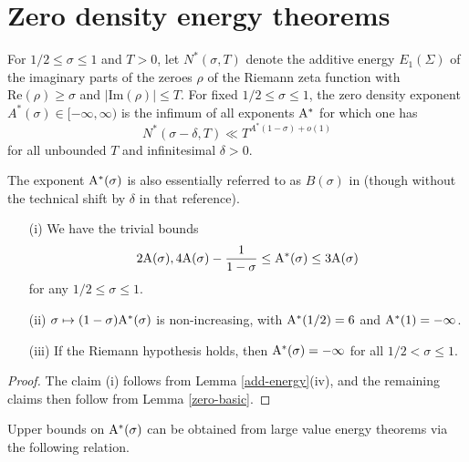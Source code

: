 \chapter{Zero density energy theorems}\label{zero-density-energy-chapter}


\begin{definition}\label{zeroe-def}  For $1/2 \leq \sigma \leq 1$ and $T>0$, let $N^*(\sigma,T)$ denote the additive energy $E_1(\Sigma)$ of the imaginary parts of the zeroes $\rho$ of the Riemann zeta function with $\mathrm{Re}(\rho) \geq \sigma$ and $|\mathrm{Im}(\rho)| \leq T$.  For fixed $1/2 \leq \sigma \leq 1$, the zero density exponent $A^*(\sigma) \in [-\infty,\infty)$ is the infimum of all exponents $\mathrm{A}^*$ for which one has
    $$ N^*(\sigma-\delta,T) \ll T^{A^* (1-\sigma)+o(1)}$$
for all unbounded $T$ and infinitesimal $\delta>0$.
\end{definition}

The exponent $\mathrm{A}^*(\sigma)$ is also essentially referred to as $B(\sigma)$ in \cite{heath_brown_consecutive_II} (though without the technical shift by $\delta$ in that reference).


\begin{lemma}\label{zeroe-basic}
\begin{itemize}
\item[(i)] We have the trivial bounds
$$ 2\mathrm{A}(\sigma), 4\mathrm{A}(\sigma)-\frac{1}{1-\sigma} \leq \mathrm{A}^*(\sigma) \leq 3 \mathrm{A}(\sigma)$$
for any $1/2 \leq \sigma \leq 1$.
\item[(ii)] $\sigma \mapsto (1-\sigma) \mathrm{A}^*(\sigma)$ is non-increasing, with $\mathrm{A}^*(1/2)=6$ and $\mathrm{A}^*(1)=-\infty$.
\item[(iii)] If the Riemann hypothesis holds, then $\mathrm{A}^*(\sigma)=-\infty$ for all $1/2 < \sigma \leq 1$.
\end{itemize}
\end{lemma}


\begin{proof} The claim (i) follows from Lemma \ref{add-energy}(iv), and the remaining claims then follow from Lemma \ref{zero-basic}.\end{proof}

Upper bounds on $\mathrm{A}^*(\sigma)$ can be obtained from large value energy theorems via the following relation.

